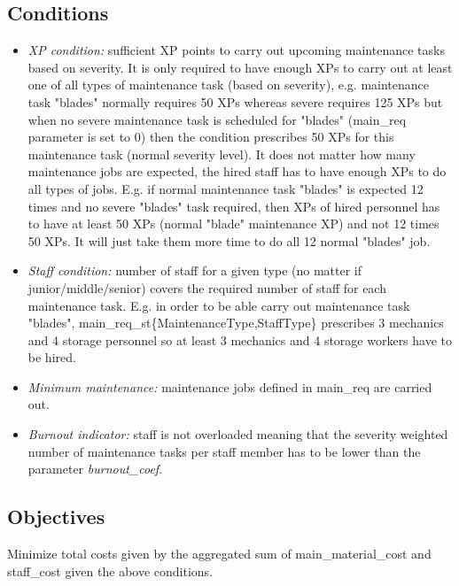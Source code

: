     \subsection{Conditions}
      \begin{itemize}
        \item \textit{XP condition:} sufficient XP points to carry out upcoming maintenance tasks based on severity. 
        It is only required to have enough XPs to carry out at least one of all types of maintenance task 
        (based on severity), e.g. maintenance task "blades" normally requires 50 XPs whereas severe 
        requires 125 XPs but when no severe maintenance task is scheduled for "blades" (main\_req parameter 
        is set to 0) then the condition prescribes 50 XPs for this maintenance task (normal severity level).
        It does not matter how many maintenance jobs are expected, the hired staff has to have 
        enough XPs to do all types of jobs. E.g. if normal maintenance task "blades" is expected 
        12 times and no severe "blades" task required, then XPs of hired personnel has to have at least 
        50 XPs (normal "blade" maintenance XP) and not 12 times 50 XPs. It will just take them more time 
        to do all 12 normal "blades" job.
        \item \textit{Staff condition:} number of staff for a given type (no matter if junior/middle/senior) 
        covers the required number of staff for each maintenance task. E.g. in order to be able carry 
        out maintenance task "blades", main\_req\_st\{MaintenanceType,StaffType\} prescribes 3 mechanics 
        and 4 storage personnel so at least 3 mechanics and 4 storage workers have to be hired.
        \item \textit{Minimum maintenance:} maintenance jobs defined in main\_req are carried out.
        \item \textit{Burnout indicator:} staff is not overloaded meaning that the severity weighted number 
        of maintenance tasks per staff member has to be lower than the parameter \textit{burnout\_coef}.
      \end{itemize}

    \subsection{Objectives}
    Minimize total costs given by the aggregated sum of main\_material\_cost and staff\_cost given 
    the above conditions.